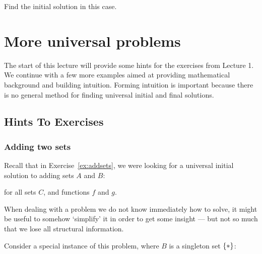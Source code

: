 \begin{exercise}
    Find the initial solution in this case.
\end{exercise}


\chapter{More universal problems}

The start of this lecture will provide some hints for the exercises from
Lecture 1.  We continue with a few more examples aimed at providing
mathematical background and building intuition.  Forming intuition is
important because there is no general method for finding universal initial and
final solutions.

\section{Hints To Exercises}

\subsection{Adding two sets}

Recall that in Exercise~\ref{ex:addsets}, we were looking for a universal
initial solution to adding sets $A$ and $B$:
\begin{center}
\end{center}
for all sets $C$, and functions $f$ and $g$.

When dealing with a problem we do not know immediately how to solve, it might be
useful to somehow `simplify' it in order to get some insight --- but not so much
that we lose all structural information.

Consider a special instance of this problem, where $B$ is a singleton set
$\{ \ast \}$:

\begin{center}
\end{center}


